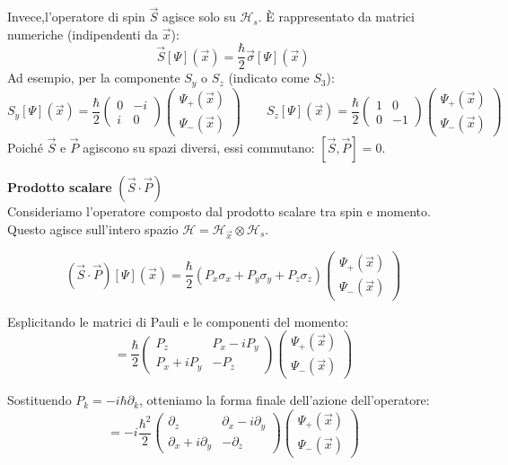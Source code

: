 Invece,l'operatore di spin \( \vec{S} \) agisce solo su \( \mathcal{H}_s \). È rappresentato da matrici numeriche (indipendenti da \( \vec{x} \)):
\[
\vec{S}[\Psi](\vec{x}) = \frac{\hbar}{2} \vec{\sigma} [\Psi](\vec{x})
\]
Ad esempio, per la componente \( S_y \) o \( S_z \) (indicato come \( S_3 \)):
\[
S_y [\Psi](\vec{x}) = \frac{\hbar}{2} \begin{pmatrix} 0 & -i \\ i & 0 \end{pmatrix} \begin{pmatrix} \Psi_+(\vec{x}) \\ \Psi_-(\vec{x}) \end{pmatrix}
\qquad
S_z [\Psi](\vec{x}) = \frac{\hbar}{2} \begin{pmatrix} 1 & 0 \\ 0 & -1 \end{pmatrix} \begin{pmatrix} \Psi_+(\vec{x}) \\ \Psi_-(\vec{x}) \end{pmatrix}
\]
Poiché \( \vec{S} \) e \( \vec{P} \) agiscono su spazi diversi, essi commutano: \( [\vec{S}, \vec{P}] = 0 \).

\begin{example} \textbf{Prodotto scalare } \((\vec{S} \cdot \vec{P})\)\\
Consideriamo l'operatore composto dal prodotto scalare tra spin e momento. Questo agisce sull'intero spazio \( \mathcal{H} = \mathcal{H}_{\vec{x}} \otimes \mathcal{H}_s \).

\[
(\vec{S} \cdot \vec{P}) [\Psi](\vec{x}) = \frac{\hbar}{2} (P_x \sigma_x + P_y \sigma_y + P_z \sigma_z) \begin{pmatrix} \Psi_+(\vec{x}) \\ \Psi_-(\vec{x}) \end{pmatrix}
\]

Esplicitando le matrici di Pauli e le componenti del momento:
\[
= \frac{\hbar}{2} \begin{pmatrix} P_z & P_x - i P_y \\ P_x + i P_y & -P_z \end{pmatrix} \begin{pmatrix} \Psi_+(\vec{x}) \\ \Psi_-(\vec{x}) \end{pmatrix}
\]

Sostituendo \( P_k = -i\hbar \partial_k \), otteniamo la forma finale dell'azione dell'operatore:
\[
= -i \frac{\hbar^2}{2} \begin{pmatrix} \partial_z & \partial_x - i\partial_y \\ \partial_x + i\partial_y & -\partial_z \end{pmatrix} \begin{pmatrix} \Psi_+(\vec{x}) \\ \Psi_-(\vec{x}) \end{pmatrix}
\]
\end{example}

